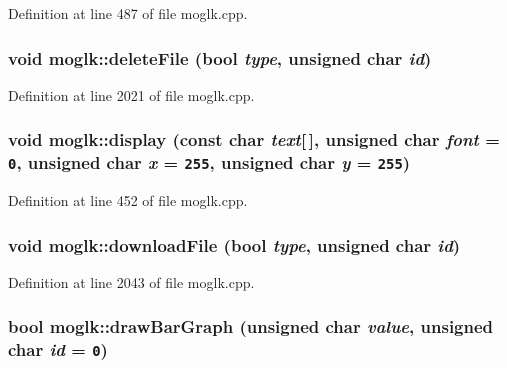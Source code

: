 Definition at line 487 of file moglk.cpp.\hypertarget{classmoglk_a1953b9ffbeb39433686cb30fe72cdab}{
\subsubsection[{deleteFile}]{\setlength{\rightskip}{0pt plus 5cm}void moglk::deleteFile (bool {\em type}, \/  unsigned char {\em id})}}
\label{classmoglk_a1953b9ffbeb39433686cb30fe72cdab}




Definition at line 2021 of file moglk.cpp.\hypertarget{classmoglk_cf30cd08a2e1434e68b386236f4060bd}{
\subsubsection[{display}]{\setlength{\rightskip}{0pt plus 5cm}void moglk::display (const char {\em text}\mbox{[}$\,$\mbox{]}, \/  unsigned char {\em font} = {\tt 0}, \/  unsigned char {\em x} = {\tt 255}, \/  unsigned char {\em y} = {\tt 255})}}
\label{classmoglk_cf30cd08a2e1434e68b386236f4060bd}




Definition at line 452 of file moglk.cpp.\hypertarget{classmoglk_f8a03d73de173bee806acf9d51cba608}{
\subsubsection[{downloadFile}]{\setlength{\rightskip}{0pt plus 5cm}void moglk::downloadFile (bool {\em type}, \/  unsigned char {\em id})}}
\label{classmoglk_f8a03d73de173bee806acf9d51cba608}




Definition at line 2043 of file moglk.cpp.\hypertarget{classmoglk_cf8048cc54c879ae2ee4942ce451c108}{
\subsubsection[{drawBarGraph}]{\setlength{\rightskip}{0pt plus 5cm}bool moglk::drawBarGraph (unsigned char {\em value}, \/  unsigned char {\em id} = {\tt 0})}}
\label{classmoglk_cf8048cc54c879ae2ee4942ce451c108}




